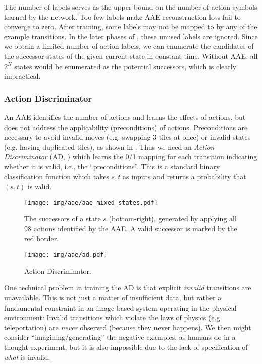 \documentclass[10pt,letterpaper]{article}
\begin{document}
The number of labels serves as the upper bound on  the number of action symbols learned by the network.
Too few labels make AAE reconstruction loss fail to converge to zero.
After training, some labels may not be mapped to by any of the example transitions.
In the later phases of \latentplanner, these unused labels are ignored.
Since we obtain a limited number of action labels,
we can enumerate the candidates of the successor states of the given current state in constant time.
Without AAE, all $2^N$ states would be enumerated as the potential successors, which is clearly impractical.

\subsubsection{Action Discriminator}

An AAE identifies the number of actions and learns the effects of actions, but does not address the applicability (preconditions) of actions.
Preconditions are necessary to avoid invalid moves (e.g. swapping 3 tiles at once) or invalid states (e.g. having duplicated tiles), as shown in .
% 
Thus we need an \textit{Action Discriminator} (AD, ) which learns the 0/1 mapping for each transition indicating whether it is valid, i.e., the ``preconditions''. This is a standard binary classification function which takes $s,t$ as inputs and returns a probability that $(s,t)$ is valid.

\begin{figure}[tbp]
 \centering
 \texttt{[image: img/aae/aae\_mixed\_states.pdf]}
\caption{The successors of a state $s$ (bottom-right),
  generated by applying all 98 actions identified by the AAE.
 A valid successor is marked by the red border.}
 \label{fig:aae-mixed}
\end{figure}

\begin{figure}[tbp]
 \centering
 \texttt{[image: img/aae/ad.pdf]}
 \caption{Action Discriminator.}
 \label{fig:ad}
\end{figure}

One technical problem in training the AD is that explicit \emph{invalid} transitions are unavailable.
This is not just a matter of insufficient data, but rather a fundamental constraint in an image-based system operating in the physical environment: Invalid transitions which violate the laws of physics (e.g. teleportation) are \emph{never} observed (because they never happens).
We then might consider ``imagining/generating'' the negative examples, as humans do in a thought experiment, but it is also impossible due to the lack of specification of \emph{what} is invalid.
\end{document}
